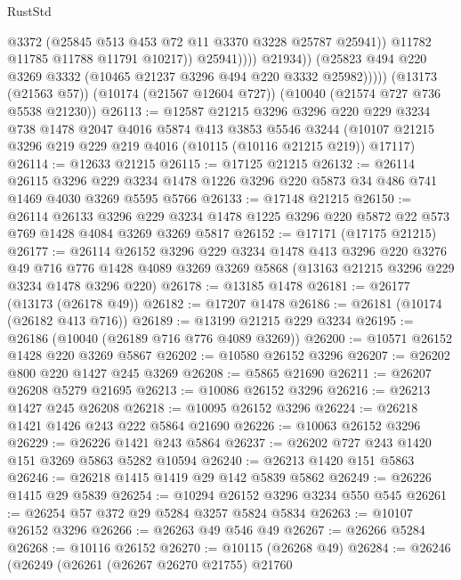 \begin{lexlean}{RustStd}
\begin{coremodule}
                            @3372
                            (@25845 @513 @453 @72 @11 @3370 @3228 @25787 @25941))
                          @11782
                          @11785
                          @11788
                          @11791
                          @10217))
                      @25941))))
              @21934))
          (@25823 @494 @220 @3269 @3332 (@10465 @21237 @3296 @494 @220 @3332 @25982)))))
    (@13173 (@21563 @57))
    (@10174 (@21567 @12604 @727))
    (@10040 (@21574 @727 @736 @5538 @21230))
@26113 := @12587
    @21215
    @3296
    @3296
    @220
    @229
    @3234
    @738
    @1478
    @2047
    @4016
    @5874
    @413
    @3853
    @5546
    @3244
    (@10107 @21215 @3296 @219 @229 @219 @4016 (@10115 (@10116 @21215 @219)) @17117)
@26114 := @12633 @21215
@26115 := @17125 @21215
@26132 := @26114
    @26115
    @3296
    @229
    @3234
    @1478
    @1226
    @3296
    @220
    @5873
    @34
    @486
    @741
    @1469
    @4030
    @3269
    @5595
    @5766
@26133 := @17148 @21215
@26150 := @26114
    @26133
    @3296
    @229
    @3234
    @1478
    @1225
    @3296
    @220
    @5872
    @22
    @573
    @769
    @1428
    @4084
    @3269
    @3269
    @5817
@26152 := @17171 (@17175 @21215)
@26177 := @26114
    @26152
    @3296
    @229
    @3234
    @1478
    @413
    @3296
    @220
    @3276
    @49
    @716
    @776
    @1428
    @4089
    @3269
    @3269
    @5868
    (@13163 @21215 @3296 @229 @3234 @1478 @3296 @220)
@26178 := @13185 @1478
@26181 := @26177 (@13173 (@26178 @49))
@26182 := @17207 @1478
@26186 := @26181 (@10174 (@26182 @413 @716))
@26189 := @13199 @21215 @229 @3234
@26195 := @26186 (@10040 (@26189 @716 @776 @4089 @3269))
@26200 := @10571 @26152 @1428 @220 @3269 @5867
@26202 := @10580 @26152 @3296
@26207 := @26202 @800 @220 @1427 @245 @3269
@26208 := @5865 @21690
@26211 := @26207 @26208 @5279 @21695
@26213 := @10086 @26152 @3296
@26216 := @26213 @1427 @245 @26208
@26218 := @10095 @26152 @3296
@26224 := @26218 @1421 @1426 @243 @222 @5864 @21690
@26226 := @10063 @26152 @3296
@26229 := @26226 @1421 @243 @5864
@26237 := @26202 @727 @243 @1420 @151 @3269 @5863 @5282 @10594
@26240 := @26213 @1420 @151 @5863
@26246 := @26218 @1415 @1419 @29 @142 @5839 @5862
@26249 := @26226 @1415 @29 @5839
@26254 := @10294 @26152 @3296 @3234 @550 @545
@26261 := @26254 @57 @372 @29 @5284 @3257 @5824 @5834
@26263 := @10107 @26152 @3296
@26266 := @26263 @49 @546 @49
@26267 := @26266 @5284
@26268 := @10116 @26152
@26270 := @10115 (@26268 @49)
@26284 := @26246
    (@26249
      (@26261
        (@26267 @26270 @21755)
        @21760

\end{coremodule}
\end{lexlean}
